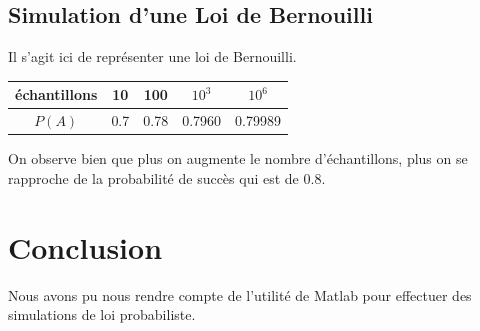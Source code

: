 \documentclass[a4paper,oneside]{article}
\begin{document}
\newpage
\subsection{Simulation d'une Loi de Bernouilli}

Il s'agit ici de représenter une loi de Bernouilli.

 \begin{center}
\begin{tabular}{|c|c|c|c|c|}
 
\hline
 	échantillons & 10 & 100 & $10^3$ & $10^6$\\
 	\hline
 	$P(A)$ & 0.7 & 0.78 & 0.7960 & 0.79989 \\ 
 	
 	\hline
 	\end{tabular}
 	\end{center}
 	
 On observe bien que plus on augmente le nombre d'échantillons, plus on se rapproche de la probabilité de succès qui est de $0.8$.	
 
 \section{Conclusion}
 
Nous avons pu nous rendre compte de l'utilité de Matlab pour effectuer des simulations de loi probabiliste.
 
\end{document}
